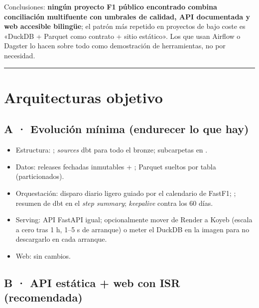 Conclusiones: \textbf{ningún proyecto F1 público encontrado combina conciliación multifuente con umbrales de calidad, API documentada y web accesible bilingüe}; el patrón más repetido en proyectos de bajo coste es «DuckDB + Parquet como contrato + sitio estático». Los que usan Airflow o Dagster lo hacen sobre todo como demostración de herramientas, no por necesidad.

\medskip\noindent\textcolor{muted!40}{\rule{\linewidth}{0.3pt}}\medskip

\section{Arquitecturas objetivo}

\subsection{A · Evolución mínima (endurecer lo que hay)}

\begin{itemize}
\item Estructura: ; \emph{sources} dbt para todo el bronze; subcarpetas en .
\item Datos: releases fechadas inmutables + ; Parquet sueltos por tabla (particionados).
\item Orquestación: disparo diario ligero guiado por el calendario de FastF1; ; resumen de dbt en el \emph{step summary}; \emph{keepalive} contra los 60 días.
\item Serving: API FastAPI igual; opcionalmente mover de Render a Koyeb (escala a cero tras 1 h, 1–5 s de arranque) o meter el DuckDB en la imagen para no descargarlo en cada arranque.
\item Web: sin cambios.
\end{itemize}

\subsection{B · API estática + web con ISR (recomendada)}

